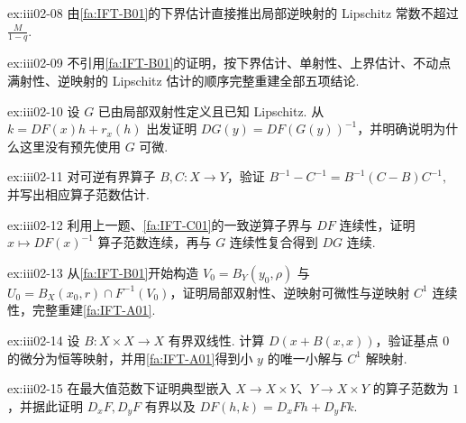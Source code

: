 \begin{FAExercise}{ex:iii02-08}
由\autoref{fa:IFT-B01}的下界估计直接推出局部逆映射的 Lipschitz 常数不超过 \(\displaystyle \frac{M}{1-q}\).
\end{FAExercise}

\begin{FAExercise}[完整重建定量逆函数估计]{ex:iii02-09}
不引用\autoref{fa:IFT-B01}的证明，按下界估计、单射性、上界估计、不动点满射性、逆映射的 Lipschitz 估计的顺序完整重建全部五项结论.
\end{FAExercise}

\begin{FAExercise}[无循环论证的逆映射微分]{ex:iii02-10}
设 \(\displaystyle G\) 已由局部双射性定义且已知 Lipschitz. 从 \(\displaystyle k=DF(x)h+r_x(h)\) 出发证明 \(\displaystyle DG(y)=DF(G(y))^{-1}\)，并明确说明为什么这里没有预先使用 \(\displaystyle G\) 可微.
\end{FAExercise}

\begin{FAExercise}[逆算子恒等式]{ex:iii02-11}
对可逆有界算子 \(\displaystyle B,C:X\to Y\)，验证
\(\displaystyle B^{-1}-C^{-1}=B^{-1}(C-B)C^{-1},\)
并写出相应算子范数估计.
\end{FAExercise}

\begin{FAExercise}{ex:iii02-12}
利用上一题、\autoref{fa:IFT-C01}的一致逆算子界与 \(\displaystyle DF\) 连续性，证明 \(\displaystyle x\mapsto DF(x)^{-1}\) 算子范数连续，再与 \(\displaystyle G\) 连续性复合得到 \(\displaystyle DG\) 连续.
\end{FAExercise}

\begin{FAExercise}{ex:iii02-13}
从\autoref{fa:IFT-B01}开始构造 \(\displaystyle V_0=B_Y(y_0,\rho)\) 与 \(\displaystyle U_0=B_X(x_0,r)\cap F^{-1}(V_0)\)，证明局部双射性、逆映射可微性与逆映射 \(\displaystyle C^1\) 连续性，完整重建\autoref{fa:IFT-A01}.
\end{FAExercise}

\begin{FAExercise}[二次非线性方程]{ex:iii02-14}
设 \(\displaystyle B:X\times X\to X\) 有界双线性. 计算 \(\displaystyle D(x+B(x,x))\)，验证基点 \(\displaystyle0\) 的微分为恒等映射，并用\autoref{fa:IFT-A01}得到小 \(\displaystyle y\) 的唯一小解与 \(\displaystyle C^1\) 解映射.
\end{FAExercise}

\begin{FAExercise}{ex:iii02-15}
在最大值范数下证明典型嵌入 \(\displaystyle X\to X\times Y\)、\(\displaystyle Y\to X\times Y\) 的算子范数为 \(\displaystyle1\)，并据此证明 \(\displaystyle D_xF,D_yF\) 有界以及 \(\displaystyle DF(h,k)=D_xFh+D_yFk\).
\end{FAExercise}

